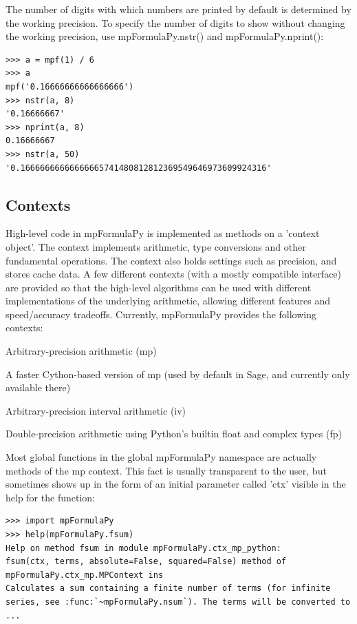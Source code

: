 The number of digits with which numbers are printed by default is determined by the working precision. To specify the number of digits to show without changing the working precision, use mpFormulaPy.nstr() and mpFormulaPy.nprint():

\begin{lstlisting}
>>> a = mpf(1) / 6
>>> a
mpf('0.16666666666666666')
>>> nstr(a, 8)
'0.16666667'
>>> nprint(a, 8)
0.16666667
>>> nstr(a, 50)
'0.16666666666666665741480812812369549646973609924316'
\end{lstlisting}














\subsection{Contexts}  

High-level code in mpFormulaPy is implemented as methods on a 'context object'. The context implements arithmetic, type conversions and other fundamental operations. The context also holds settings such as precision, and stores cache data. A few different contexts (with a
mostly compatible interface) are provided so that the high-level algorithms can be used with different implementations of the underlying arithmetic, allowing different features and speed/accuracy tradeoffs. Currently, mpFormulaPy provides the following contexts:

\vpara
Arbitrary-precision arithmetic (mp)

A faster Cython-based version of mp (used by default in Sage, and currently only available there)

Arbitrary-precision interval arithmetic (iv)

Double-precision arithmetic using Python's builtin float and complex types (fp)

\vpara
Most global functions in the global mpFormulaPy namespace are actually methods of the mp context. This fact is usually transparent to the user, but sometimes shows up in the form of an initial parameter called 'ctx' visible in the help for the function:

\begin{lstlisting}
>>> import mpFormulaPy
>>> help(mpFormulaPy.fsum)
Help on method fsum in module mpFormulaPy.ctx_mp_python:
fsum(ctx, terms, absolute=False, squared=False) method of mpFormulaPy.ctx_mp.MPContext ins
Calculates a sum containing a finite number of terms (for infinite
series, see :func:`~mpFormulaPy.nsum`). The terms will be converted to
...
\end{lstlisting}



